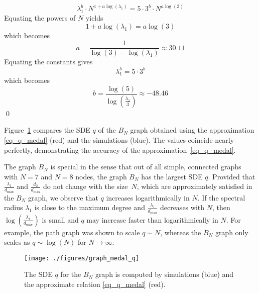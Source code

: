 \documentclass{comnet}%
\begin{document}
\begin{equation*}
	\lambda_1^b \cdot N^{1+a \log(\lambda_1)} = 5 \cdot 3^b \cdot N^{a \log(3)}
\end{equation*}
Equating the powers of $N$ yields
\begin{equation*}
	1 + a \log(\lambda_1) = a \log(3)
\end{equation*}
which becomes
\begin{equation*}
	a = \frac{1}{\log(3)-\log(\lambda_1)} \approx 30.11
\end{equation*}
Equating the constants gives
\begin{equation*}
	\lambda_1^b = 5 \cdot 3^b
\end{equation*}
which becomes
\begin{equation*}
	b = \frac{\log(5)}{\log\left(\frac{\lambda_1}{3}\right)} \approx -48.46
\end{equation*} 
\hfill\qed


Figure~\ref{fig_medal_graph_q} compares the SDE $q$ of the $B_N$ graph obtained using the approximation \eqref{eq_q_medal} (red) and the simulations (blue). The values coincide nearly perfectly, demonstrating the accuracy of the approximation~\eqref{eq_q_medal}. 

The graph $B_N$ is special in the sense that out of all simple, connected graphs with $N=7$ and $N=8$ nodes, the graph $B_N$ has the largest SDE $q$. Provided that $\frac{\lambda_{1}}{d_{\max}}$ and $\frac{d_2}{d_{\max}}$ do not change with the size~$N$, which are approximately satisfied in the $B_N$ graph, we observe that $q$ increases logarithmically in $N$. If the spectral radius $\lambda_{1}$ is close to the maximum degree and $\frac{\lambda_{1}}{d_{\max}}$ decreases with $N$, then $\log\left(  \frac{\lambda_{1}}{d_{\max}}\right)$ is small and $q$ may increase faster than logarithmically in $N$. For example, the path graph was shown to scale $q \sim N$, whereas the $B_N$ graph only scales as $q \sim \log(N)$ for $N \to \infty$.

\begin{figure}[H]
	\centering
	\texttt{[image: ./figures/graph\_medal\_q]}
	\caption{The SDE $q$ for the $B_N$ graph is computed by simulations (blue) and the approximate relation \eqref{eq_q_medal} (red).}
	\label{fig_medal_graph_q}
\end{figure}
\end{document}
